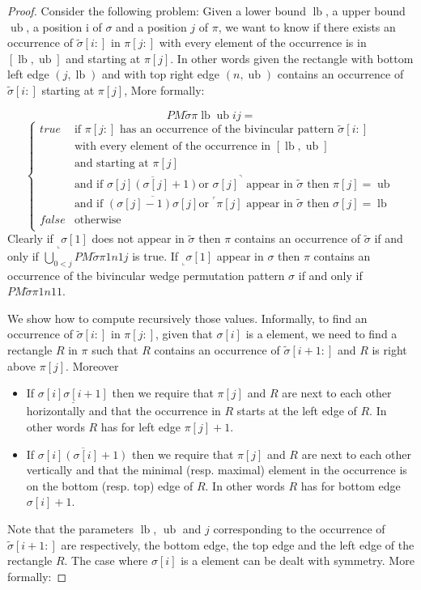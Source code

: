 \documentclass[a4paper]{llncs}
\newcommand{\RLMin}{\text{RLMin}}
\newcommand{\RLMax}{\text{RLMax}}
\newcommand{\ptext}{\pi}
\newcommand{\PM}{PM}
\DeclareMathOperator{\lb}{lb}
\DeclareMathOperator{\ub}{ub}
\begin{document}
\begin{proof}
Consider the following problem:
Given a lower bound $\lb$, a upper bound $\ub$, a position i of $\sigma$
and a position $j$ of $\pi$, we want to know if
there exists an occurrence of $\widetilde{\sigma}[i:]$ in $\ptext[j:]$
with every element of the occurrence is in $[\lb,\ub]$
and starting at $\pi[j]$.
In other words given the rectangle with bottom left edge
$(j,\lb)$ and with top right edge $(n,\ub)$
contains an occurrence of $\widetilde{\sigma}[i:]$
starting at $\pi[j]$,
More formally:

$$
\PM{\widetilde{\sigma}}{\ptext}{\lb}{\ub}{i}{j}=
$$
$$
\begin{cases}
	true 	& \text{if $\ptext[j:]$ has an occurrence of the bivincular pattern $\widetilde{\sigma}[i:]$ }\\
			& \text{with every element of the occurrence in $[\lb,\ub]$}\\
			& \text{and starting at $\pi[j]$}\\
			& \text{and if $\overline{\sigma[j](\sigma[j]+1)}$
			 or $\sigma[j]^\urcorner$ appear in $\widetilde{\sigma}$ then $\pi[j]=\ub$} \\
			& \text{and if $\overline{(\sigma[j]-1)\sigma[j]}$
			 or $^\ulcorner{\pi[j]}$ appear in $\widetilde{\sigma}$ then $\sigma[j]=\lb$} \\
	false 	& \text{otherwise}\\
\end{cases}
$$
Clearly if $_\llcorner{\sigma[1]}$ does not appear in $\widetilde{\sigma}$
then $\pi$ contains an occurrence of $\widetilde{\sigma}$
if and only if $\bigcup_{0<j} \PM{\widetilde{\sigma}}{\ptext}{1}{n}{1}{j}$ is true.
If $_\llcorner{\sigma[1]}$ appear in $\sigma$ then
$\pi$ contains an occurrence of
the bivincular wedge permutation pattern $\sigma$
if and only if $\PM{\widetilde{\sigma}}{\ptext}{1}{n}{1}{1}$.

We show how to compute recursively those values.
Informally, to find an occurrence of $\widetilde{\sigma}[i:]$ in $\pi[j:]$,
given that $\sigma[i]$ is a \RLMin element,
we need to find a rectangle $R$ in $\pi$
such that $R$ contains an occurrence of $\widetilde{\sigma}[i+1:]$
and $R$ is right above $\pi[j]$.
Moreover
\begin{itemize}
\item If $\underline{\sigma[i]\sigma[i+1]}$ then
we require that $\pi[j]$ and $R$ are next to each other horizontally
and that the occurrence in $R$ starts at the left edge of $R$.
In other words $R$ has for left edge $\pi[j]+1$.
\item If $\overline{\sigma[i](\sigma[i]+1)}$ then
we require that $\pi[j]$ and $R$ are next to each other vertically
and that the minimal (resp. maximal) element in the occurrence
is on the bottom (resp. top) edge of $R$.
In other words $R$ has for bottom edge $\sigma[i]+1$.
\end{itemize}
Note that the parameters $\lb$, $\ub$ and $j$ corresponding
to the occurrence of $\widetilde{\sigma}[i+1:]$ are respectively,
the bottom edge, the top edge and the left edge of the rectangle $R$.
The case where $\sigma[i]$ is a \RLMax element can be dealt with symmetry.
More formally:


\end{proof}
\end{document}
